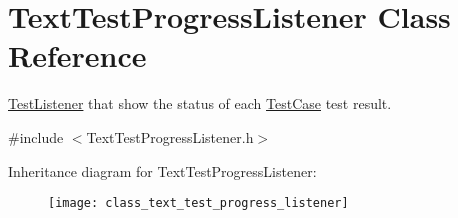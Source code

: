 \hypertarget{class_text_test_progress_listener}{}\section{Text\+Test\+Progress\+Listener Class Reference}
\label{class_text_test_progress_listener}


\hyperlink{class_test_listener}{Test\+Listener} that show the status of each \hyperlink{class_test_case}{Test\+Case} test result.  




{\ttfamily \#include $<$Text\+Test\+Progress\+Listener.\+h$>$}

Inheritance diagram for Text\+Test\+Progress\+Listener\+:\begin{figure}[H]
\begin{center}
\leavevmode
\texttt{[image: class\_text\_test\_progress\_listener]}
\end{center}
\end{figure}
